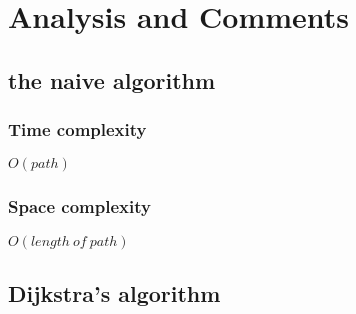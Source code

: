 \chapter{Analysis and Comments}

\section{the naive algorithm}

\subsection{Time complexity}
$O(path)$

\subsection{Space complexity}
$O(length~of~path)$

\section{Dijkstra's algorithm}

